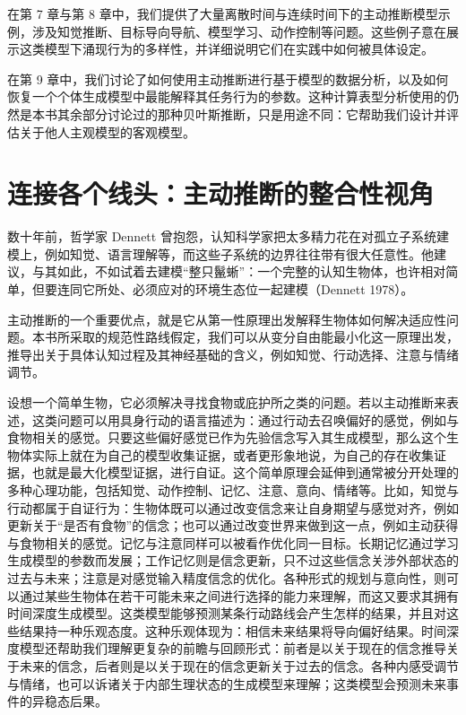 在第 7 章与第 8 章中，我们提供了大量离散时间与连续时间下的主动推断模型示例，涉及知觉推断、目标导向导航、模型学习、动作控制等问题。这些例子意在展示这类模型下涌现行为的多样性，并详细说明它们在实践中如何被具体设定。

在第 9 章中，我们讨论了如何使用主动推断进行基于模型的数据分析，以及如何恢复一个个体生成模型中最能解释其任务行为的参数。这种计算表型分析使用的仍然是本书其余部分讨论过的那种贝叶斯推断，只是用途不同：它帮助我们设计并评估关于他人主观模型的客观模型。

\section{连接各个线头：主动推断的整合性视角}

数十年前，哲学家 Dennett 曾抱怨，认知科学家把太多精力花在对孤立子系统建模上，例如知觉、语言理解等，而这些子系统的边界往往带有很大任意性。他建议，与其如此，不如试着去建模“整只鬣蜥”：一个完整的认知生物体，也许相对简单，但要连同它所处、必须应对的环境生态位一起建模（Dennett 1978）。

主动推断的一个重要优点，就是它从第一性原理出发解释生物体如何解决适应性问题。本书所采取的规范性路线假定，我们可以从变分自由能最小化这一原理出发，推导出关于具体认知过程及其神经基础的含义，例如知觉、行动选择、注意与情绪调节。

设想一个简单生物，它必须解决寻找食物或庇护所之类的问题。若以主动推断来表述，这类问题可以用具身行动的语言描述为：通过行动去召唤偏好的感觉，例如与食物相关的感觉。只要这些偏好感觉已作为先验信念写入其生成模型，那么这个生物体实际上就在为自己的模型收集证据，或者更形象地说，为自己的存在收集证据，也就是最大化模型证据，进行自证。这个简单原理会延伸到通常被分开处理的多种心理功能，包括知觉、动作控制、记忆、注意、意向、情绪等。比如，知觉与行动都属于自证行为：生物体既可以通过改变信念来让自身期望与感觉对齐，例如更新关于“是否有食物”的信念；也可以通过改变世界来做到这一点，例如主动获得与食物相关的感觉。记忆与注意同样可以被看作优化同一目标。长期记忆通过学习生成模型的参数而发展；工作记忆则是信念更新，只不过这些信念关涉外部状态的过去与未来；注意是对感觉输入精度信念的优化。各种形式的规划与意向性，则可以通过某些生物体在若干可能未来之间进行选择的能力来理解，而这又要求其拥有时间深度生成模型。这类模型能够预测某条行动路线会产生怎样的结果，并且对这些结果持一种乐观态度。这种乐观体现为：相信未来结果将导向偏好结果。时间深度模型还帮助我们理解更复杂的前瞻与回顾形式：前者是以关于现在的信念推导关于未来的信念，后者则是以关于现在的信念更新关于过去的信念。各种内感受调节与情绪，也可以诉诸关于内部生理状态的生成模型来理解；这类模型会预测未来事件的异稳态后果。

